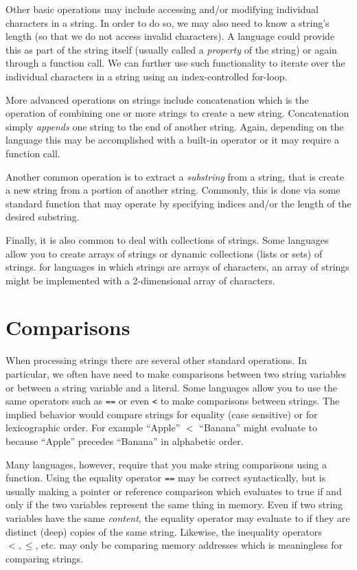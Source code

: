 Other basic operations may include accessing and/or
modifying individual characters in a string.  In order
to do so, we may also need to know a string's length
(so that we do not access invalid characters).  A
language could provide this as part of the string itself
(usually called a \emph{property} of the string) or again
through a function call.  We can further use such functionality
to iterate over the individual characters in a string using
an index-controlled for-loop.

More advanced operations on strings include \gls{concatenation}
which is the operation of combining one or more strings
to create a new string.  Concatenation simply \emph{appends}
one string to the end of another string.  Again, depending
on the language this may be accomplished with a built-in
operator or it may require a function call.

Another common operation is to extract a \emph{substring}
from a string, that is create a new string from a portion of
another string.  Commonly, this is done via some standard
function that may operate by specifying indices and/or the
length of the desired substring.

Finally, it is also common to deal with collections of strings.  
Some languages allow you to create arrays of strings or 
dynamic collections (lists or sets) of strings.  for languages
in which strings are arrays of characters, an array of strings
might be implemented with a 2-dimensional array of characters.

\section{Comparisons}

When processing strings there are several other standard operations.
In particular, we often have need to make comparisons between
two string variables or between a string variable and a literal.
Some languages allow you to use the same operators such as
\texttt{==} or even \texttt{<} to make comparisons
between strings.  The implied behavior would compare strings for
equality (case sensitive) or for \gls{lexicographic} order.  For example
``Apple'' $<$ ``Banana'' might evaluate to \True because 
``Apple'' precedes ``Banana'' in alphabetic order.

Many languages, however, require that you make string comparisons
using a function.  Using the equality operator \texttt{==} may
be correct syntactically, but is usually making a pointer or 
reference comparison which evaluates to true if and only if the
two variables represent the same thing in memory.  Even if two
string variables have the same \emph{content}, the equality operator
may evaluate to \False if they are distinct (deep) copies of the
same string.  Likewise, the inequality operators $<, \leq$, etc. may
only be comparing memory addresses which is meaningless
for comparing strings.


